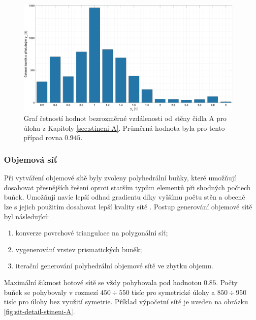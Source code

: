             \begin{figure}[ht!]
                \centering
                \includegraphics*[width=\textwidth  ]{300_VYPOCETNI_MODEL/yplus-stineni-A.eps}
                \caption{Graf četností hodnot bezrozměrné vzdálenosti od stěny čidla A pro úlohu z Kapitoly \ref{sec:stineni-A}. Průměrná hodnota byla pro tento případ rovna $0.945$.}
                \label{fig:yplus-stineni-A}
            \end{figure}

            \newpage


        \subsubsection{Objemová síť}

        Při vytváření objemové sítě byly zvoleny polyhedrální buňky, které umožňují dosahovat přesnějších řešení oproti starším typům elementů při shodných počtech buňek. Umožňují navíc lepší odhad gradientu díky vyššímu počtu stěn a obecně lze s jejich použitím dosahovat lepší kvality sítě \cite{Sosnowski2018}. Postup generování objemové sítě byl následující:

        \begin{enumerate}
            \item konverze povrchové triangulace na polygonální síť;
            \item vygenerování vrstev prismatických buněk;
            \item iterační generování polyhedrální objemové sítě ve zbytku objemu.
        \end{enumerate}

        Maximální šikmost hotové sítě se vždy pohybovala pod hodnotou $0.85$. Počty buňek se pohybovaly v rozmezí $450 \div 550$ tisíc pro symetrické úlohy a $850 \div 950$ tisíc pro úlohy bez využití symetrie. Příklad výpočetní sítě je uveden na obrázku \ref{fig:sit-detail-stineni-A}.

